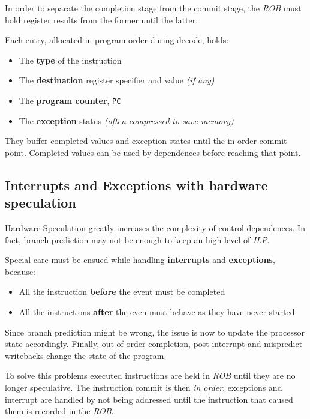 \documentclass[english]{article}
\begin{document}
\bigskip
In order to separate the completion stage from the commit stage, the \textit{ROB} must hold register results from the former until the latter.

Each entry, allocated in program order during decode, holds:

\begin{itemize}
  \item The \textbf{type} of the instruction
  \item The \textbf{destination} register specifier and value \textit{(if any)}
  \item The \textbf{program counter}, \texttt{PC}
  \item The \textbf{exception} status \textit{(often compressed to save memory)}
\end{itemize}

They buffer completed values and exception states until the in-order commit point.
Completed values can be used by  dependences before reaching that point.

\subsection{Interrupts and Exceptions with hardware speculation}

Hardware Speculation greatly increases the complexity of control  dependences.
In fact, branch prediction may not be enough to keep an high level of \textit{ILP}.

Special care must be ensued while handling \textbf{interrupts} and \textbf{exceptions}, because:

\begin{itemize}
  \item All the instruction \textbf{before} the event must be completed
  \item All the instructions \textbf{after} the even must behave as they have never started
\end{itemize}

Since branch prediction might be wrong, the issue is now to update the processor state accordingly.
Finally, out of order completion, post interrupt and mispredict writebacks change the state of the program.

To solve this problems executed instructions are held in \textit{ROB} until they are no longer speculative.
The instruction commit is then \textit{in order}: exceptions and interrupt are handled by not being addressed until the instruction that caused them is recorded in the \textit{ROB}.
\end{document}
